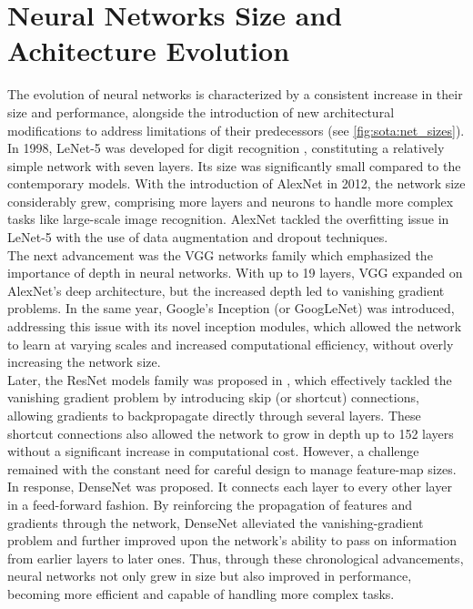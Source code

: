 \section{Neural Networks Size and Achitecture Evolution}

The evolution of neural networks is characterized by a consistent increase in
their size and performance, alongside the introduction of new architectural
modifications to address limitations of their predecessors (see
\cref{fig:sota:net_sizes}). In 1998, LeNet-5 was developed for digit recognition
\cite{DBLP:journals/pieee/LeCunBBH98}, constituting a relatively simple network
with seven layers. Its size was significantly small compared to the contemporary
models. With the introduction of AlexNet \cite{DBLP:conf/nips/KrizhevskySH12} in
2012, the network size considerably grew, comprising more layers and neurons to
handle more complex tasks like large-scale image recognition. AlexNet tackled
the overfitting issue in LeNet-5 with the use of data augmentation and dropout
techniques.\\


The next advancement was the VGG networks family
\cite{DBLP:journals/corr/SimonyanZ14a} %
which emphasized the importance of depth in neural networks. With up to 19
layers, VGG expanded on AlexNet's deep architecture, but the increased depth led
to vanishing gradient problems. In the same year, Google's Inception (or
GoogLeNet) \cite{DBLP:conf/cvpr/SzegedyLJSRAEVR15} was introduced, addressing
this issue with its novel inception modules, which allowed the network to learn
at varying scales and increased computational efficiency, without overly
increasing the network size.\\

Later, the ResNet models family was proposed in \cite{DBLP:conf/cvpr/HeZRS16},
which effectively tackled the vanishing gradient problem by introducing skip (or
shortcut) connections, allowing gradients to backpropagate directly through
several layers. These shortcut connections also allowed the network to grow in
depth up to 152 layers without a significant increase in computational cost.
However, a challenge remained with the constant need for careful design to
manage feature-map sizes.\\

In response, DenseNet \cite{huang2017densely} was proposed.%
It connects each layer to every other layer in a feed-forward fashion. By
reinforcing the propagation of features and gradients through the network,
DenseNet alleviated the vanishing-gradient problem and further improved upon the
network's ability to pass on information from earlier layers to later ones.
Thus, through these chronological advancements, neural networks not only grew in
size but also improved in performance, becoming more efficient and capable of
handling more complex tasks.

